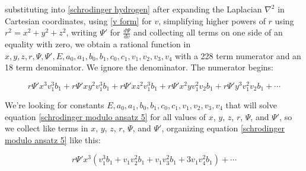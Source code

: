 \documentclass{article}
\begin{document}
substituting into \eqref{schrodinger hydrogen} after expanding the Laplacian $\nabla^2$ in Cartesian coordinates,
using \eqref{v form} for $v$,
simplifying higher powers of $r$ using $r^2=x^2+y^2+z^2$,
writing $\Psi'$ for $\frac{d\Psi}{dv}$
and collecting all terms on one side of an equality with zero,
we obtain
a rational function in $x, y, z, r, \Psi, \Psi', E, a_0, a_1, b_0, b_1, c_0, c_1, v_1, v_2, v_3, v_4$
with a 228 term numerator and an 18 term denominator.  We ignore the denominator.  The numerator begins:

\begin{equation}
\label{schrodinger modulo ansatz 5}
r \Psi' x^{3} v_{1}^{3} b_{1} + r \Psi' x y^{2} v_{1}^{3} b_{1} + r \Psi' x z^{2} v_{1}^{3} b_{1} + r \Psi' x^{2} y v_{1}^{2} v_{2} b_{1} + r \Psi' y^{3} v_{1}^{2} v_{2} b_{1} + \cdots
\end{equation}

We're looking for
constants $E, a_0, a_1, b_0, b_1, c_0, c_1, v_1, v_2, v_3, v_4$
that will solve equation \eqref{schrodinger modulo ansatz 5} for all values of $x$, $y$, $z$, $r$,
$\Psi$, and $\Psi'$, so
we collect like terms in $x$, $y$, $z$, $r$, $\Psi$, and $\Psi'$, organizing equation \eqref{schrodinger modulo ansatz 5} like this:

\begin{equation}
\label{example collection of like terms}
r \Psi' x^{3} \left( v_{1}^{3} b_{1} + v_{1} v_{2}^{2} b_{1} + v_{1} v_{3}^{2} b_{1} + 3 v_{1} v_{4}^{2} b_{1}\right) + \cdots
\end{equation}
\end{document}
